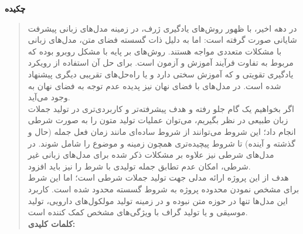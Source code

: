 \thispagestyle{empty}
\centerline{\textbf{\large{چکیده}}}
\begin{quote}
در دهه اخیر، با ظهور روش­‌های یادگیری ژرف، در زمینه مدل‌­های زبانی پیشرفت شایانی صورت گرفته است: اما به دلیل ذات گسسته فضای متن، مدل‌های زبانی با مشکلات متعددی مواجه هستند. روش‌های بر پایه \teacherforcing{} با مشکل \expbias{} روبرو بوده که مربوط به تفاوت فرآیند آموزش و آزمون است. برای حل آن استفاده از رويکرد يادگيری تقويتی و \gan{} که آموزش سختی دارد و یا راه‌حل‌های تقریبی دیگری پيشنهاد شده است. در مدل‌های با فضای نهان نیز پدیده عدم توجه \decoder{} به فضای نهان به وجود می‌آید.
\\
اگر بخواهیم یک گام جلو رفته و هدف پیشرفته­‌تر و کاربردی‌­تری در تولید جملات زبان طبیعی در نظر بگیریم، می‌­توان عملیات تولید متون را به صورت شرطی انجام داد؛ این شروط می­‌توانند از شروط ساده­‌ای مانند زمان فعل جمله (حال و گذشته و آینده) تا شروط پیچیده‌­تری همچون زمینه و موضوع را شامل شوند. در مدل‌های شرطی نیز علاوه بر مشکلات ذکر شده برای مدل‌های زبانی غیر شرطی، امکان عدم تطابق جمله تولیدی با شرط را نیز باید افزود.
\\
هدف از این پروژه ارائه مدلی \generative{} جهت تولید جملات شرطی است؛ اما این شرط برای مشخص نمودن محدوده پروژه به شروط گسسته محدود شده است. کاربرد این مدل‌ها تنها در حوزه متن نبوده و در زمینه تولید مولکول‌های دارویی، تولید موسیقی و یا تولید گراف با ویژگی‌های مشخص کمک کننده است.\\

\vskip 1cm
\textbf{کلمات کلیدی:} \textiranic{}
\end{quote}